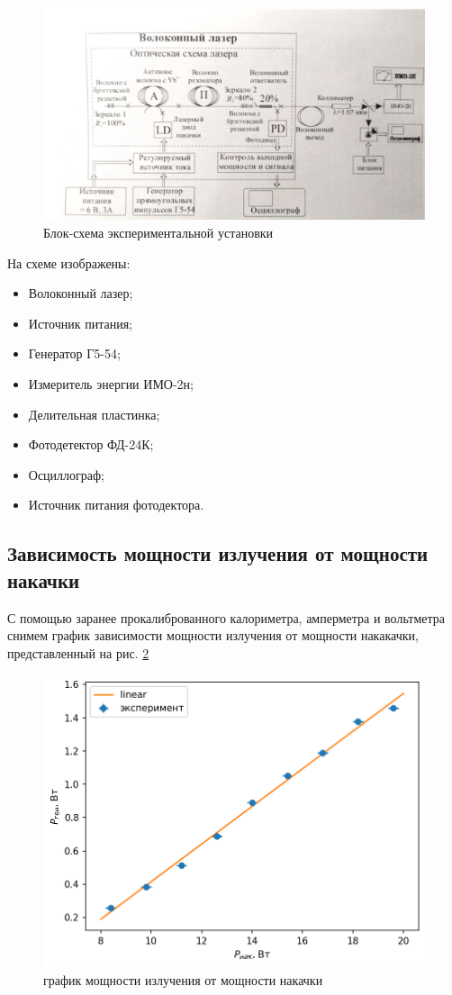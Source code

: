 \documentclass[a4paper]{article}
\begin{document}
\begin{figure}[H]
\centering
\includegraphics[width=0.8\linewidth]{scheme.png}
\caption{Блок-схема экспериментальной установки}
\label{fig:scheme}
\end{figure}

На схеме изображены:
\begin{itemize}
\item Волоконный лазер;
\item Источник питания;
\item Генератор Г5-54;
\item Измеритель энергии ИМО-2н;
\item Делительная пластинка;
\item Фотодетектор ФД-24К;
\item Осциллограф;
\item Источник питания фотодектора.
\end{itemize}

\subsection{Зависимость мощности излучения от мощности накачки}

С помощью заранее прокалиброванного калориметра, амперметра и вольтметра снимем график зависимости мощности излучения от мощности накакачки, представленный на рис. \ref{fig:P_vs_P}


\begin{figure}[H]
\centering
\includegraphics[width=0.5\linewidth]{P_vs_P.png}
\caption{график мощности излучения от мощности накачки}
\label{fig:P_vs_P}
\end{figure}
\end{document}
